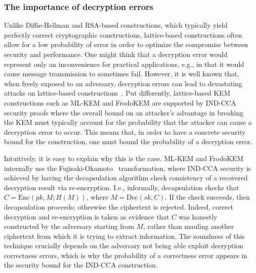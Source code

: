 \subsubsection*{The importance of decryption errors}
Unlike Diffie-Hellman and RSA-based constructions, which typically yield perfectly correct cryptographic constructions, lattice-based constructions often allow for a low probability of error in order to optimize the compromise between security and performance. 
One might think that a decryption error would represent only an inconvenience for practical applications, e.g., in that it would cause message transmission to sometimes fail.
However, it is well known that, when freely exposed to an adversary, decryption errors can lead to devastating attacks on lattice-based constructions~\cite{PKC:DAnBat22,PQCRYPTO:BinSch20,PKC:DGJNVV19b}. 
Put differently, lattice-based KEM  constructions such as ML-KEM and FrodoKEM are supported by IND-CCA security proofs where the overall bound on an attacker's advantage in breaking the KEM must typically account for the probability that the attacker can cause a decryption error to occur. This means that, in order to have a concrete security bound for the construction, one must bound the probability of a decryption error. 

Intuitively, it is easy to explain why this is the case. ML-KEM and FrodoKEM internally use the Fujisaki-Okamoto~\cite{} transformation, where IND-CCA security is achieved by having the decapsulation algorithm check consistency of a recovered decryption result via re-encryption. I.e., informally, decapsulation checks that $C = \mathrm{Enc}(pk,M;H(M))$, where $M = \mathrm{Dec}(sk,C)$. 
If the check succeeds, then decapsulation proceeds; otherwise the ciphertext is rejected.
Indeed, correct decryption and re-encryption is taken as evidence that $C$ was honestly constructed by the adversary starting from $M$, rather than mauling another ciphertext from which it is trying to extract information.
The soundness of this technique crucially depends on the adversary not being able exploit decryption correctness errors, which is why the probability of a correctness error appears in the security bound for the IND-CCA construction.

